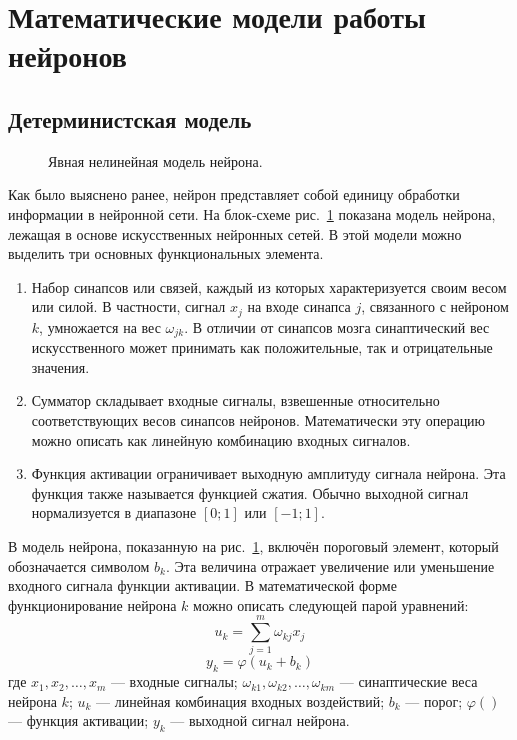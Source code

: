 \section{Математические модели работы нейронов}
\subsection{Детерминистская модель}
\begin{figure}[h]
\caption{Явная нелинейная модель нейрона.}
\label{ris:BlockScheme}
\end{figure}
Как было выяснено ранее, нейрон представляет собой единицу обработки информации в нейронной сети. 
На блок-схеме рис.~\ref{ris:BlockScheme} показана модель нейрона, лежащая в основе искусственных нейронных сетей.
В этой модели можно выделить три основных функциональных элемента.
\begin{enumerate}
\item Набор синапсов или связей, каждый из которых характеризуется своим весом или силой.
В частности, сигнал $x_j$ на входе синапса $j$, связанного с нейроном $k$, умножается на вес $\omega_{jk}$.
В отличии от синапсов мозга синаптический вес искусственного может принимать как положительные, так и отрицательные значения. 
\item Сумматор складывает входные сигналы, взвешенные относительно соответствующих весов синапсов нейронов.
Математически эту операцию можно описать как линейную комбинацию входных сигналов.
\item Функция активации ограничивает выходную амплитуду сигнала нейрона.
Эта функция также называется функцией сжатия.
Обычно выходной сигнал нормализуется в диапазоне $[0;1]$ или $[-1;1]$.
\end{enumerate}
В модель нейрона, показанную на рис.~\ref{ris:BlockScheme}, включён пороговый элемент, который обозначается символом $b_k$.
Эта величина отражает увеличение или уменьшение входного сигнала функции активации.
В математической форме функционирование нейрона $k$ можно описать следующей парой уравнений:
\begin{equation}
u_k = \sum_{j=1}^{m} \omega_{kj}x_j
\end{equation}
\begin{equation}
y_k = \varphi (u_k + b_k)
\end{equation}
где $x_1,x_2,\dots,x_m$ --- входные сигналы;
$\omega_{k1},\omega_{k2},\dots,\omega_{km}$ --- синаптические веса нейрона $k$;
$u_k$ --- линейная комбинация входных воздействий;
$b_k$ --- порог;
$\varphi()$ --- функция активации;
$y_k$ --- выходной сигнал нейрона.\cite{NejronnyeSeti}
